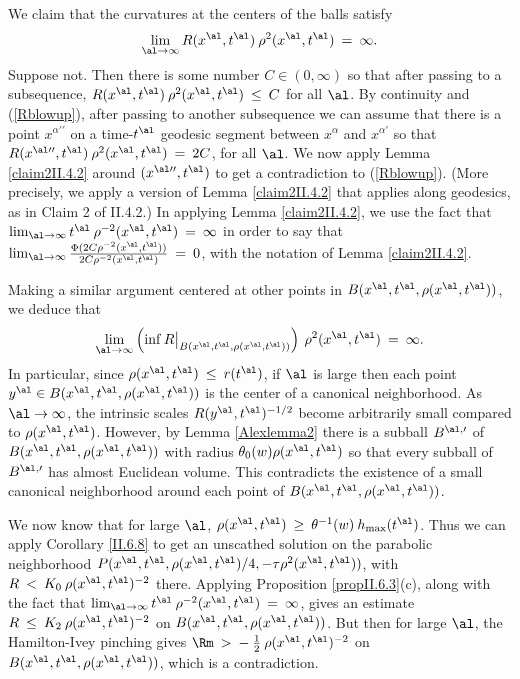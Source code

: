 We claim that
the curvatures at the centers of the balls satisfy
\begin{equation}
\lim_{\al \rightarrow \infty} R(x^{\al}, t^\al) \: \rho^2(x^\al, t^\al) \: = \: \infty.
\end{equation}
Suppose not. Then there is some number $C \in (0, \infty)$ so that
after passing to a subsequence,
$R(x^{\al}, t^\al) \: \rho^2(x^\al, t^\al) \: \le \: C$ for all $\al$.
By continuity and (\ref{Rblowup}),
after passing to another subsequence we can assume that there is a point
$x^{\alpha\prime \prime}$ on a time-$t^\al$ geodesic segment between
$x^{\alpha}$ and $x^{\alpha \prime}$ so that
$R(x^{\al \prime \prime}, t^\al) \: \rho^2(x^\al, t^\al) \: = \: 2C$,
for all $\al$. We now apply Lemma \ref{claim2II.4.2} around
$(x^{\al \prime \prime}, t^\al)$ to get a contradiction to
(\ref{Rblowup}).
(More precisely, we apply a version of
Lemma \ref{claim2II.4.2} that applies along geodesics, as in Claim 2 of
II.4.2.) In applying Lemma \ref{claim2II.4.2}, we use the fact that
$\lim_{\al \rightarrow \infty} t^\al \: \rho^{-2}(x^\al, t^\al) \: = \:
\infty$ in order to say that
$\lim_{\al \rightarrow \infty}
\frac{\Phi(2C\rho^{-2}(x^\al, t^\al))}{2C\rho^{-2}(x^\al, t^\al)} \: = \: 0$,
with the notation of Lemma \ref{claim2II.4.2}.

Making a similar argument centered at other points in
$B(x^\al, t^\al, \rho(x^\al, t^\al))$, we deduce that
\begin{equation}
\lim_{\al \rightarrow \infty} \left( \inf R \big|_{B(x^\al, t^\al, \rho(x^\al, t^\al))} \right) \:
\rho^2(x^\al, t^\al) \: = \: \infty.
\end{equation}
In particular, since $\rho(x^\al, t^\al) \: \le \: r(t^\al)$, if $\al$ is
large then each point
$y^\al \in B(x^\al, t^\al, \rho(x^\al, t^\al))$ is the center of a canonical
neighborhood.
As $\al \rightarrow \infty$, the intrinsic scales
$R(y^{\al}, t^\al)^{-1/2}$ become arbitrarily small compared to $\rho(x^\al, t^\al)$.
However, by Lemma \ref{Alexlemma2} there is a subball $B^{\al, \prime}$ of
$B(x^\al,t^\al,\rho(x^\al,t^\al))$ with radius $\theta_0(w) \rho(x^\al,t^\al)$ so that every subball of
$B^{\al,\prime}$ has almost Euclidean volume. This contradicts the existence of a small
canonical neighborhood around each point of $B(x^\al,t^\al,\rho(x^\al,t^\al))$.


We now know that for large $\al$,
$\rho(x^\al, t^\al) \: \ge \: \theta^{-1}(w) \: h_{\max}(t^\al)$.
Thus we can apply Corollary \ref{II.6.8} to get an unscathed solution on the
parabolic neighborhood
$P(x^\al, t^\al, \rho(x^\al, t^\al)/4, - \tau \rho^2(x^\al, t^\al))$, with
$R \: < \: K_0 \: \rho(x^\al, t^\al)^{-2}$ there. Applying
Proposition \ref{propII.6.3}(c),
along with the fact that
$\lim_{\al \rightarrow \infty} t^\al \: \rho^{-2}(x^\al, t^\al) \: = \:
\infty$,
gives an estimate $R \: \le \: K_2 \: \rho(x^\al, t^\al)^{-2}$ on
$B(x^\al, t^\al, \rho(x^\al, t^\al))$.
But then for large $\al$, the Hamilton-Ivey
pinching gives $\Rm \: > \: - \: \frac12 \: \rho(x^\al, t^\al)^{-2}$ on
$B(x^\al, t^\al, \rho(x^\al, t^\al))$, which is a contradiction.
\endgroup\par\medskip

